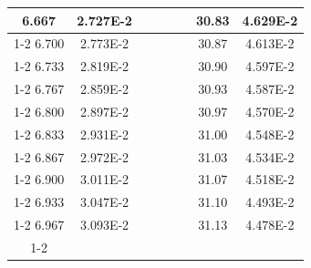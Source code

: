 \documentclass[article,12pt]{elsarticle}
\begin{document}
\begin{longtable}[c]{|c|c|cccccc}
6.667    & 2.727E-2  &                       &                              &                            & \multicolumn{1}{c|}{} & \multicolumn{1}{c|}{30.83}   & \multicolumn{1}{c|}{4.629E-2} \\ \cline{1-2} \cline{7-8} 
6.700    & 2.773E-2  &                       &                              &                            & \multicolumn{1}{c|}{} & \multicolumn{1}{c|}{30.87}   & \multicolumn{1}{c|}{4.613E-2} \\ \cline{1-2} \cline{7-8} 
6.733    & 2.819E-2  &                       &                              &                            & \multicolumn{1}{c|}{} & \multicolumn{1}{c|}{30.90}   & \multicolumn{1}{c|}{4.597E-2} \\ \cline{1-2} \cline{7-8} 
6.767    & 2.859E-2  &                       &                              &                            & \multicolumn{1}{c|}{} & \multicolumn{1}{c|}{30.93}   & \multicolumn{1}{c|}{4.587E-2} \\ \cline{1-2} \cline{7-8} 
6.800    & 2.897E-2  &                       &                              &                            & \multicolumn{1}{c|}{} & \multicolumn{1}{c|}{30.97}   & \multicolumn{1}{c|}{4.570E-2} \\ \cline{1-2} \cline{7-8} 
6.833    & 2.931E-2  &                       &                              &                            & \multicolumn{1}{c|}{} & \multicolumn{1}{c|}{31.00}   & \multicolumn{1}{c|}{4.548E-2} \\ \cline{1-2} \cline{7-8} 
6.867    & 2.972E-2  &                       &                              &                            & \multicolumn{1}{c|}{} & \multicolumn{1}{c|}{31.03}   & \multicolumn{1}{c|}{4.534E-2} \\ \cline{1-2} \cline{7-8} 
6.900    & 3.011E-2  &                       &                              &                            & \multicolumn{1}{c|}{} & \multicolumn{1}{c|}{31.07}   & \multicolumn{1}{c|}{4.518E-2} \\ \cline{1-2} \cline{7-8} 
6.933    & 3.047E-2  &                       &                              &                            & \multicolumn{1}{c|}{} & \multicolumn{1}{c|}{31.10}   & \multicolumn{1}{c|}{4.493E-2} \\ \cline{1-2} \cline{7-8} 
6.967    & 3.093E-2  &                       &                              &                            & \multicolumn{1}{c|}{} & \multicolumn{1}{c|}{31.13}   & \multicolumn{1}{c|}{4.478E-2} \\ \cline{1-2} \cline{7-8} 

\end{longtable}
\end{document}
